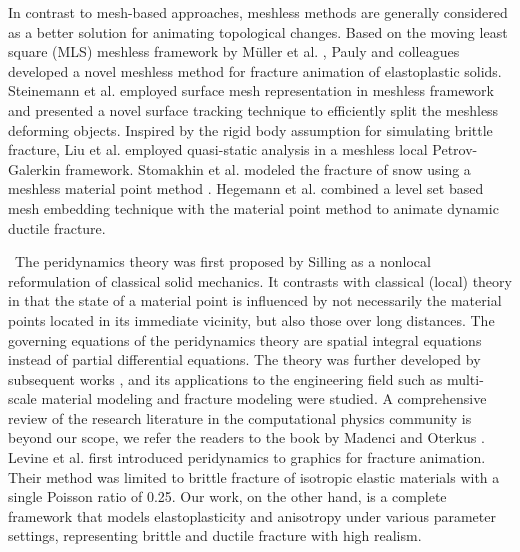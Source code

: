 In contrast to mesh-based approaches, meshless methods are generally considered as a better solution for animating topological changes. Based on the moving least square (MLS) meshless framework by M\"{u}ller et al. \cite{Muller:2004:PBA:1028523.1028542}, Pauly and colleagues \cite{Pauly:2005:MAF:1073204.1073296} developed a novel meshless method for fracture animation of elastoplastic solids. Steinemann et al. \cite{Steinemann:2009:SMD:1651926.1652002} employed surface mesh representation in meshless framework and presented a novel surface tracking technique to efficiently split the meshless deforming objects. Inspired by the rigid body assumption for simulating brittle fracture, Liu et al. \cite{Liu:2011:MSB:1970281.1970303} employed quasi-static analysis in a meshless local Petrov-Galerkin framework. Stomakhin et al. modeled the fracture of snow using a meshless material point method \cite{Stomakhin:2013:MPM:2461912.2461948}. Hegemann et al. \cite{Hegemann:2013:LSM:2485895.2485908} combined a level set based mesh embedding technique with the material point method to animate dynamic ductile fracture.

~The peridynamics theory was first proposed by Silling \cite{Silling2000} as a nonlocal reformulation of classical solid mechanics. It contrasts with classical (local) theory in that the state of a material point is influenced by not necessarily the material points located in its immediate vicinity, but also those over long distances. The governing equations of the peridynamics theory are spatial integral equations instead of partial differential equations. The theory was further developed by subsequent works \cite{silling2007peridynamic,emmrich2013peridynamics}, and its applications to the engineering field such as multi-scale material modeling \cite{askari2008peridynamics,silling2014hierarchical} and fracture modeling \cite{askari2006peridynamic,silling2010crack,silling2014peridynamic} were studied. A comprehensive review of the research literature in the computational physics community is beyond our scope, we refer the readers to the book by Madenci and Oterkus \cite{madenci2014peridynamic}.  Levine et al. \cite{Levine:2015:PPS:2849517.2849526} first introduced peridynamics to graphics for fracture animation. Their method was limited to brittle fracture of isotropic elastic materials with a single Poisson ratio of 0.25. Our work, on the other hand, is a complete framework that models elastoplasticity and anisotropy under various parameter settings, representing brittle and ductile fracture with high realism.

